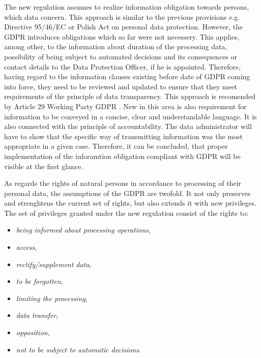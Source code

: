 \documentclass[en, noamssymb]{mgr}
\begin{document}
The new regulation assumes to realize information obligation towards persons, which data concern. This approach is similar to the previous provisions e.g. Directive 95/46/EC or Polish Act on personal data protection. However, the GDPR introduces obligations which so far were not necessery. This applies, among other, to the information about duration of the processing data, possibility of being subject to automated decisions and its consequences or contact details to the Data Protection Officer, if he is appointed. Therefore, having regard to the information clauses existing before date of GDPR coming into force, they need to be reviewed and updated to ensure that they meet requirements of the principle of data transparency. This approach is recomended by Article 29 Working Party GDPR \cite{delloite_inform}. New in this area is also requirement for information to be conveyed in a concise, clear and understandable language. It is also connected with the principle of accountability. The data administrator will have to show that the specific way of transmitting information was the most appropriate in a given case. Therefore, it can be concluded, that proper implementation of the inforamtion obligation compliant with GDPR will be visible at the first glance.


\indent As regards the rights of natural persons in accordance to processing of their personal data, the assumptions of the GDPR are twofold. It not only preserves and strenghtens the current set of rights, but also extends it with new privileges.
The set of privileges granted under the new regulation consist of the rights to\cite{giodo}:

\begin{itemize}

\item \textit{being informed about processing operations},

\item \textit{access},

\item \textit{rectify/supplement data},

\item \textit{to be forgotten},

\item \textit{limiting the processing},

\item \textit{data transfer},

\item \textit{opposition},

\item \textit{not to be subject to automatic decisions}.

\end{itemize}
\end{document}
